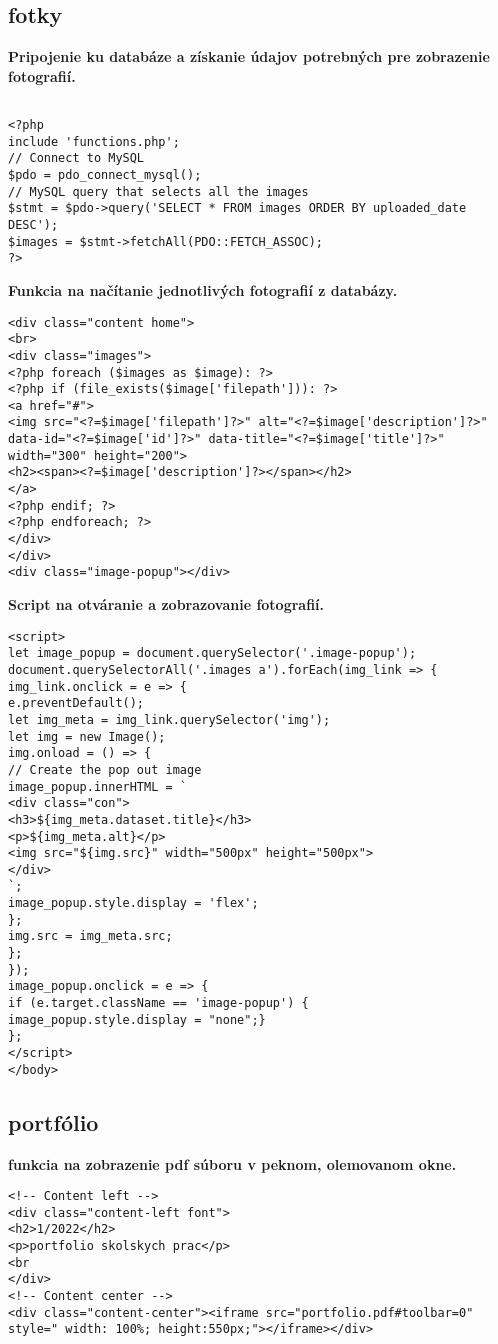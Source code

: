 \subsection{fotky}
\vspace{0.5cm}
\textbf{Pripojenie ku databáze a získanie údajov potrebných pre zobrazenie fotografií.}
\vspace{0.5cm}
\begin{lstlisting}

<?php
include 'functions.php';
// Connect to MySQL
$pdo = pdo_connect_mysql();
// MySQL query that selects all the images
$stmt = $pdo->query('SELECT * FROM images ORDER BY uploaded_date DESC');
$images = $stmt->fetchAll(PDO::FETCH_ASSOC);
?>

\end{lstlisting}
\vspace{0.5cm}
\textbf{Funkcia na načítanie jednotlivých fotografií z databázy.}
\vspace{0.5cm}
\begin{lstlisting}
<div class="content home">
<br>
<div class="images">
<?php foreach ($images as $image): ?>
<?php if (file_exists($image['filepath'])): ?>
<a href="#">
<img src="<?=$image['filepath']?>" alt="<?=$image['description']?>" data-id="<?=$image['id']?>" data-title="<?=$image['title']?>" width="300" height="200">
<h2><span><?=$image['description']?></span></h2>
</a>
<?php endif; ?>
<?php endforeach; ?>
</div>
</div>
<div class="image-popup"></div>
\end{lstlisting}
\vspace{0.5cm}
\textbf{Script na otváranie a zobrazovanie fotografií.}
\vspace{0.5cm}
\begin{lstlisting}
<script>
let image_popup = document.querySelector('.image-popup');
document.querySelectorAll('.images a').forEach(img_link => {
img_link.onclick = e => {
e.preventDefault();
let img_meta = img_link.querySelector('img');
let img = new Image();
img.onload = () => {
// Create the pop out image
image_popup.innerHTML = `
<div class="con">
<h3>${img_meta.dataset.title}</h3>
<p>${img_meta.alt}</p>
<img src="${img.src}" width="500px" height="500px">
</div>
`;
image_popup.style.display = 'flex';
};
img.src = img_meta.src;
};
});
image_popup.onclick = e => {
if (e.target.className == 'image-popup') {
image_popup.style.display = "none";}
};
</script>
</body>
\end{lstlisting}

\subsection{portfólio}
\vspace{0.5cm}
\textbf{funkcia na zobrazenie pdf súboru v peknom, olemovanom okne.}
\vspace{0.5cm}
\begin{lstlisting}
<!-- Content left -->
<div class="content-left font">
<h2>1/2022</h2>
<p>portfolio skolskych prac</p>
<br
</div>
<!-- Content center -->
<div class="content-center"><iframe src="portfolio.pdf#toolbar=0" style=" width: 100%; height:550px;"></iframe></div>
\end{lstlisting}

